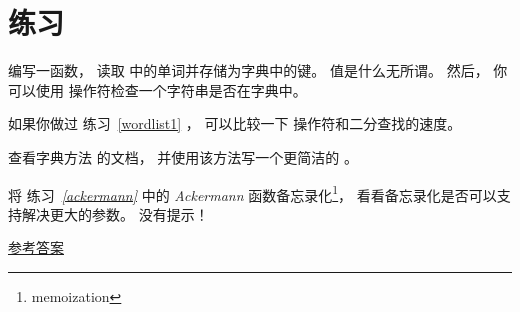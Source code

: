 


\section{练习}

\begin{exercise}
\label{wordlist2}

  


编写一函数， 读取 {\em {}} 中的单词并存储为字典中的键。  值是什么无所谓。
然后， 你可以使用 {\em {}} 操作符检查一个字符串是否在字典中。

如果你做过 练习~\ref{wordlist1} ， 可以比较一下 {\em {}} 操作符和二分查找的速度。

\end{exercise}


\begin{exercise}
\label{setdefault}


查看字典方法 {\em {}} 的文档， 并使用该方法写一个更简洁的 {\em {}}。

  

\end{exercise}


\begin{exercise}

将 练习~{\em \ref{ackermann}} 中的 {\em Ackermann} 函数备忘录化\footnote{memoization}， 看看备忘录化是否可以支持解决更大的参数。   没有提示！

\href{http://thinkpython2.com/code/ackermann_memo.py}{参考答案}
  

\end{exercise}

